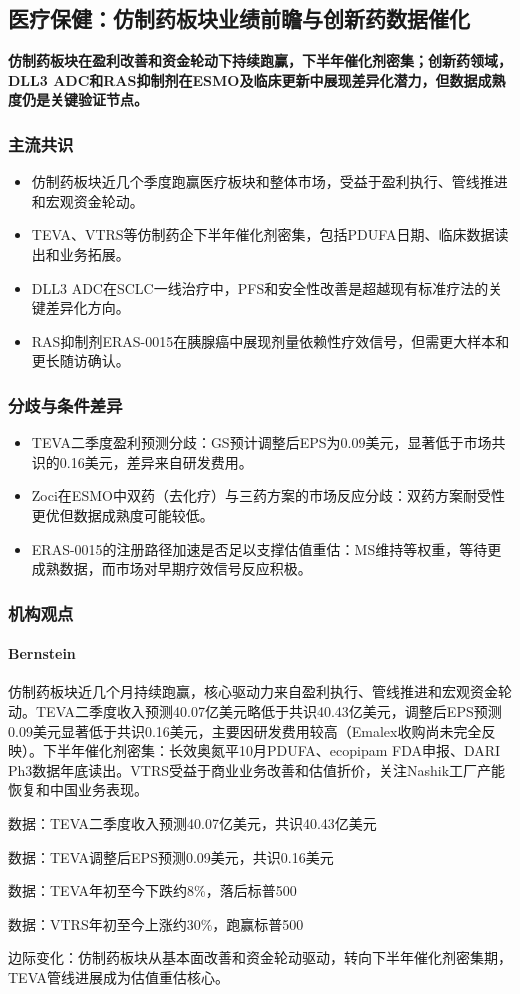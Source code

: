 \documentclass[11pt]{ctexart}
\begin{document}
\subsection{医疗保健：仿制药板块业绩前瞻与创新药数据催化}
\textbf{仿制药板块在盈利改善和资金轮动下持续跑赢，下半年催化剂密集；创新药领域，DLL3 ADC和RAS抑制剂在ESMO及临床更新中展现差异化潜力，但数据成熟度仍是关键验证节点。}
\subsubsection*{主流共识}
\begin{itemize}
  \item 仿制药板块近几个季度跑赢医疗板块和整体市场，受益于盈利执行、管线推进和宏观资金轮动。
  \item TEVA、VTRS等仿制药企下半年催化剂密集，包括PDUFA日期、临床数据读出和业务拓展。
  \item DLL3 ADC在SCLC一线治疗中，PFS和安全性改善是超越现有标准疗法的关键差异化方向。
  \item RAS抑制剂ERAS-0015在胰腺癌中展现剂量依赖性疗效信号，但需更大样本和更长随访确认。
\end{itemize}
\subsubsection*{分歧与条件差异}
\begin{itemize}
  \item TEVA二季度盈利预测分歧：GS预计调整后EPS为0.09美元，显著低于市场共识的0.16美元，差异来自研发费用。
  \item Zoci在ESMO中双药（去化疗）与三药方案的市场反应分歧：双药方案耐受性更优但数据成熟度可能较低。
  \item ERAS-0015的注册路径加速是否足以支撑估值重估：MS维持等权重，等待更成熟数据，而市场对早期疗效信号反应积极。
\end{itemize}
\subsubsection*{机构观点}
\paragraph{Bernstein} 仿制药板块近几个月持续跑赢，核心驱动力来自盈利执行、管线推进和宏观资金轮动。TEVA二季度收入预测40.07亿美元略低于共识40.43亿美元，调整后EPS预测0.09美元显著低于共识0.16美元，主要因研发费用较高（Emalex收购尚未完全反映）。下半年催化剂密集：长效奥氮平10月PDUFA、ecopipam FDA申报、DARI Ph3数据年底读出。VTRS受益于商业业务改善和估值折价，关注Nashik工厂产能恢复和中国业务表现。
{\small\color{refgray}数据：TEVA二季度收入预测40.07亿美元，共识40.43亿美元\par}
{\small\color{refgray}数据：TEVA调整后EPS预测0.09美元，共识0.16美元\par}
{\small\color{refgray}数据：TEVA年初至今下跌约8\%，落后标普500\par}
{\small\color{refgray}数据：VTRS年初至今上涨约30\%，跑赢标普500\par}
{\small\color{refgray}边际变化：仿制药板块从基本面改善和资金轮动驱动，转向下半年催化剂密集期，TEVA管线进展成为估值重估核心。\par}
\end{document}
